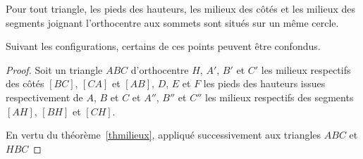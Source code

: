 \begin{thm}
Pour tout triangle, les pieds des hauteurs, les milieux des côtés et les milieux des segments joignant l'orthocentre aux sommets sont situés sur un même cercle.
\end{thm}
\begin{remark}
Suivant les configurations, certains de ces points peuvent être confondus.
\end{remark}
\begin{proof} Soit un triangle $ABC$ d'orthocentre $H$, $A'$, $B'$ et $C'$ les milieux respectifs des côtés $[BC]$, $[CA]$ et $[AB]$, $D$, $E$ et $F$ les pieds des hauteurs issues respectivement de $A$, $B$ et $C$ et $A''$, $B''$ et $C''$ les milieux respectifs des segments $[AH]$, $[BH]$ et $[CH]$.

En vertu du théorème \ref{thmilieux}, appliqué successivement aux triangles $ABC$ et $HBC$


\end{proof}
